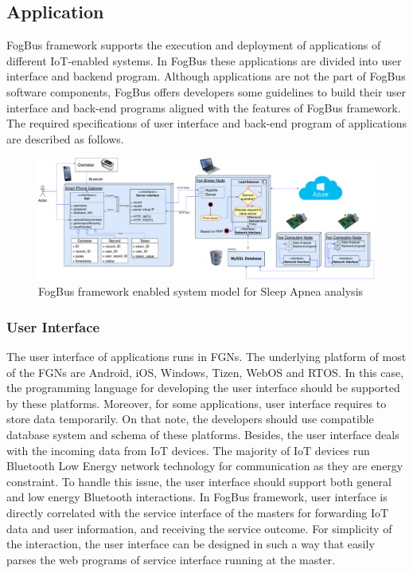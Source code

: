 \documentclass[final,5p,times,twocolumn]{elsarticle}
\begin{document}
\subsection{Application}
FogBus framework supports the execution and deployment of applications of different IoT-enabled systems. In FogBus these applications are divided into user interface and backend program. Although applications are not the part of FogBus software components, FogBus offers developers some guidelines to build their user interface and back-end programs aligned with the features of FogBus framework. The required specifications of user interface and back-end program of applications are described as follows.  
%    
\begin{figure}[ht]
\centering 
\includegraphics[width=175mm]{model-with-interface.pdf}
\caption{FogBus framework enabled system model for Sleep Apnea analysis}
\label{Fig:pro_model}
\end{figure}
%
\subsubsection{User Interface}
The user interface of applications runs in FGNs. The underlying platform of most of the FGNs are Android, iOS, Windows, Tizen, WebOS and RTOS. In this case, the programming language for developing the user interface should be supported by these platforms. Moreover, for some applications, user interface requires to store data temporarily. On that note, the developers should use compatible database system and schema of these platforms. Besides, the user interface deals with the incoming data from IoT devices. The majority of IoT devices run Bluetooth Low Energy network technology for communication as they are energy constraint. To handle this issue, the user interface should support both general and low energy Bluetooth interactions. In FogBus framework, user interface is directly correlated with the service interface of the masters for forwarding IoT data and user information, and receiving the service outcome. For simplicity of the interaction, the user interface can be designed in such a way that easily parses the web programs of service interface running at the master. 
%
\end{document}
